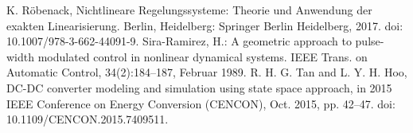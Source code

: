 \documentclass[10pt,a4paper]{article}
\begin{document}
	
	\begin{thebibliography}{10}		
		K. Röbenack, Nichtlineare Regelungssysteme: Theorie und Anwendung der exakten Linearisierung. Berlin, Heidelberg: Springer Berlin Heidelberg, 2017. doi: 10.1007/978-3-662-44091-9.
		Sira-Ramirez, H.: A geometric approach to pulse-width modulated control in nonlinear dynamical systems. IEEE Trans. on Automatic Control, 34(2):184–187, Februar 1989.
		R. H. G. Tan and L. Y. H. Hoo, DC-DC converter modeling and simulation using state space approach, in 2015 IEEE Conference on Energy Conversion (CENCON), Oct. 2015, pp. 42–47. doi: 10.1109/CENCON.2015.7409511.
	\end{thebibliography}
\end{document}
